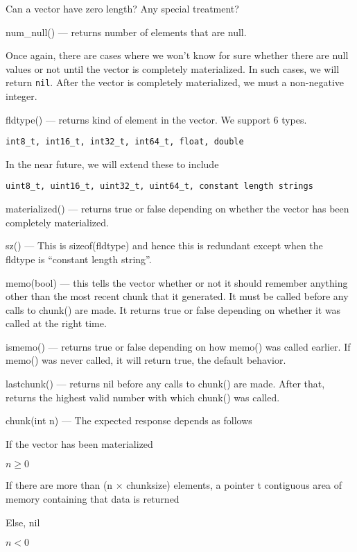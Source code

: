 Can a vector have zero length? Any special treatment? \TBC
\item num\_null() --- returns number of elements that are null.

Once again, there are cases where we won't know for sure whether there are null
values or not until the vector is completely materialized. In such cases, we
will return {\tt nil}. 
After the vector is completely materialized, we must a non-negative integer.
\item fldtype() --- returns kind of element in the vector. 
We support 6 types.
\begin{center}
{\tt int8\_t, int16\_t, int32\_t, int64\_t, float, double}
\end{center}
In the near  future, we will extend these to include 
\begin{center}
{\tt uint8\_t, uint16\_t, uint32\_t, uint64\_t, constant length strings}
\end{center}
\item materialized() --- returns true or false depending on whether the vector
has been completely materialized.
\item sz() ---  This is sizeof(fldtype) and
hence this is redundant except when the fldtype is ``constant length
string''.
\item memo(bool) --- this tells the vector whether or not it should remember
anything other than the most recent chunk that it generated. It must be called
before any calls to chunk() are made. It returns true or false depending
on whether it was called at the right time. 

\item ismemo() --- returns true or false depending on how memo() was called
earlier. If memo() was never called, it will return true, the default behavior.

\item lastchunk() --- returns nil before any calls to chunk() are made. After
that, returns the highest valid number with which chunk() was called.
\item chunk(int n) --- The expected response depends as follows
\be
\item If the vector has been materialized
\be
\item \(n \geq 0\) 
\be
\item If there are more than (n \(\times\) chunksize) elements, a pointer t
contiguous area of memory containing that data is returned
\item Else, nil
\ee
\item \(n < 0\)

